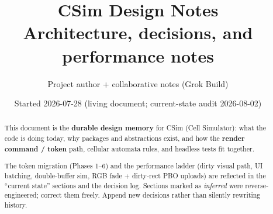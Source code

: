 \documentclass[11pt,a4paper]{article}
\title{%
  CSim Design Notes\\
  \large Architecture, decisions, and performance notes%
}
\author{Project author + collaborative notes (Grok Build)}
\date{Started 2026-07-28 \quad (living document; current-state audit 2026-08-02)}
\begin{document}
\maketitle

\begin{abstract}
This document is the \textbf{durable design memory} for CSim (Cell Simulator):
what the code is doing today, why packages and abstractions exist, and how the
\textbf{render command / token} path, cellular automata rules, and headless
tests fit together.

The token migration (Phases 1--6) and the performance ladder (dirty visual
path, UI batching, double-buffer sim, RGB fade + dirty-rect PBO uploads) are reflected
in the ``current state'' sections and the decision log. Sections marked as
\emph{inferred} were reverse-engineered; correct them freely. Append new
decisions rather than silently rewriting history.
\end{abstract}

\tableofcontents
\newpage













\appendix


\end{document}
